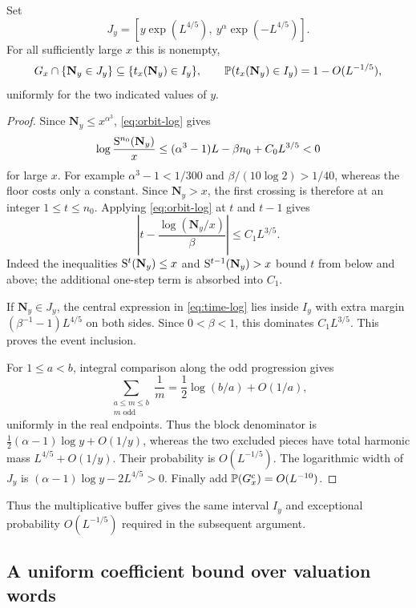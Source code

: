 \begin{proposition}\label{prop:buffer}
Set
\[
 J_y=[y\exp(L^{4/5}),\ y^\alpha\exp(-L^{4/5})].
\]
For all sufficiently large $x$ this is nonempty,
\[
 G_x\cap\{\mathbf N_y\in J_y\}\subseteq\{t_x(\mathbf N_y)\in I_y\},
 \qquad
 \mathbb P(t_x(\mathbf N_y)\in I_y)=1-O(L^{-1/5}),
\]
uniformly for the two indicated values of $y$.
\end{proposition}
\begin{proof}
Since $\mathbf N_y\leq x^{\alpha^3}$, \eqref{eq:orbit-log} gives
\[
 \log\frac{\mathrm S^{n_0}(\mathbf N_y)}x
 \leq(\alpha^3-1)L-\beta n_0+C_0L^{3/5}<0
\]
for large $x$.  For example $\alpha^3-1<1/300$ and
$\beta/(10\log2)>1/40$, whereas the floor costs only a constant.
Since $\mathbf N_y>x$, the first crossing is therefore at an integer
$1\leq t\leq n_0$.  Applying \eqref{eq:orbit-log} at $t$ and $t-1$
gives
\begin{equation}\label{eq:time-log}
 \left|t-\frac{\log(\mathbf N_y/x)}\beta\right|
 \leq C_1L^{3/5}.
\end{equation}
Indeed the inequalities $\mathrm S^t(\mathbf N_y)\leq x$
and $\mathrm S^{t-1}(\mathbf N_y)>x$ bound $t$ from below and above;
the additional one-step term is absorbed into $C_1$.

If $\mathbf N_y\in J_y$, the central expression in
\eqref{eq:time-log} lies inside $I_y$ with extra margin
$(\beta^{-1}-1)L^{4/5}$ on both sides.  Since $0<\beta<1$, this
dominates $C_1L^{3/5}$.  This proves the event inclusion.

For $1\leq a<b$, integral comparison along the odd progression gives
\[
 \sum_{\substack{a\leq m\leq b\\m\text{ odd}}}\frac1m
 =\frac12\log(b/a)+O(1/a),
\]
uniformly in the real endpoints.  Thus the block denominator is
$\frac12(\alpha-1)\log y+O(1/y)$, whereas the two excluded pieces have
total harmonic mass $L^{4/5}+O(1/y)$.  Their probability is
$O(L^{-1/5})$.  The logarithmic width of $J_y$ is
$(\alpha-1)\log y-2L^{4/5}>0$.  Finally add
$\mathbb P(G_x^c)=O(L^{-10})$.
\end{proof}

Thus the multiplicative buffer gives the same interval $I_y$ and
exceptional probability $O(L^{-1/5})$ required in the subsequent argument.

\subsection{A uniform coefficient bound over valuation words}

